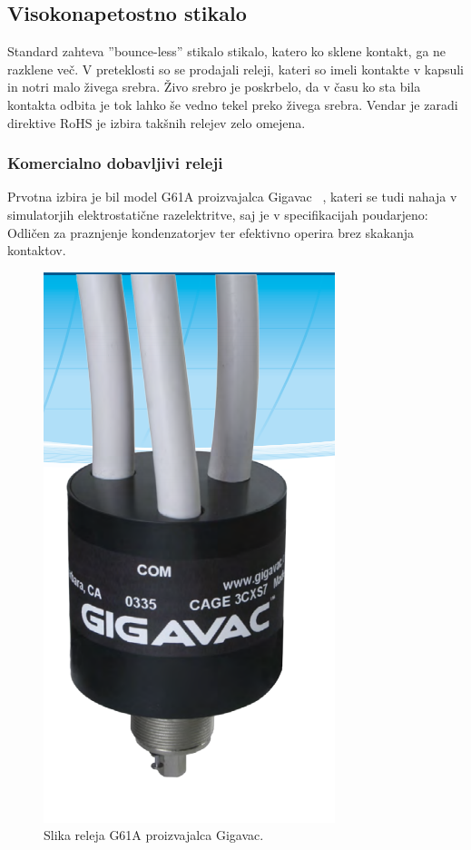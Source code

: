 \documentclass[a4paper,twoside,openright,12pt,Slovene]{book}
\begin{document}
	\subsection{Visokonapetostno stikalo} \label{Visokonapetostno stikalo}
	Standard zahteva ''bounce-less'' stikalo stikalo, katero ko sklene kontakt, ga ne razklene več. V preteklosti so se prodajali releji, kateri so imeli kontakte v kapsuli in notri malo živega srebra. Živo srebro je poskrbelo, da v času ko sta bila kontakta odbita je tok lahko še vedno tekel preko živega srebra. Vendar je zaradi direktive RoHS je izbira takšnih relejev zelo omejena.
	
	\subsubsection{Komercialno dobavljivi releji} \label{Komercialno dobavljivi releji}
     Prvotna izbira je bil model G61A proizvajalca Gigavac ~\cite{Gigavac:G61A}, kateri se tudi nahaja v simulatorjih elektrostatične razelektritve, saj je v specifikacijah poudarjeno: Odličen za praznjenje kondenzatorjev ter efektivno operira brez skakanja kontaktov.
    
    \begin{figure}[H]
        \centering
        \includegraphics[width=0.5\columnwidth]{Slike/GigavacG61C.png}
        \caption{\label{GigavacG61C} Slika releja G61A proizvajalca Gigavac.}
    \end{figure}    
    
\end{document}
